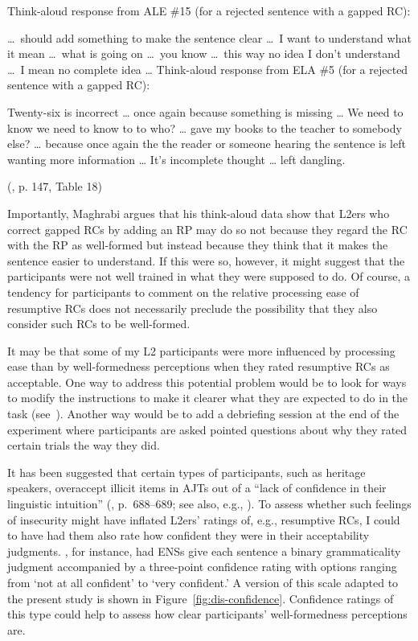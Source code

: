 \newpage

\pex\label{ex-dis-maghrabi}
\a Think-aloud response from ALE \#15 (for a rejected sentence with a gapped RC): \par\nobreak\vspace{5pt}
\dots~should add something to make the sentence clear \dots ~I want to understand what it mean \dots ~what is going on \dots ~you know \dots ~this way no idea I don't understand \dots ~I mean no complete idea \dots
\a Think-aloud response from ELA \#5 (for a rejected sentence with a gapped RC): \par\nobreak\vspace{5pt}
Twenty-six is incorrect \dots{} once again because something is missing \dots{} We need to know we need to know to to who? \dots{} gave my books to the teacher to somebody else? \dots{} because once again the the reader or someone hearing the sentence is left wanting more information \dots{} It's incomplete thought \dots{} left dangling. \par\nobreak\vspace{5pt}
\hfill (\cite{maghrabi1997}, p. 147, Table 18)
\xe 

\noindent Importantly, Maghrabi argues that his think-aloud data show that L2ers who correct gapped RCs by adding an RP may do so not because they regard the RC with the RP as well-formed but instead because they think that it makes the sentence easier to understand. If this were so, however, it might suggest that the participants were not well trained in what they were supposed to do. Of course, a tendency for participants to comment on the relative processing ease of resumptive RCs does not necessarily preclude the possibility that they also consider such RCs to be well-formed.

It may be that some of my L2 participants were more influenced by processing ease than by well-formedness perceptions when they rated resumptive RCs as acceptable. One way to address this potential problem would be to look for ways to modify the instructions to make it clearer what they are expected to do in the task (see~\cite{bley-vroman.etal1988}). Another way would be to add a debriefing session at the end of the experiment where participants are asked pointed questions about why they rated certain trials the way they did. 

It has been suggested that certain types of participants, such as heritage speakers, overaccept illicit items in AJTs out of a ``lack of confidence in their linguistic intuition'' (\cite{rinke.flores2014}, p.~688--689; see also, e.g., \cite{polinsky2016,sherkina-lieber.etal2011}). To assess whether such feelings of insecurity might have inflated L2ers' ratings of, e.g., resumptive RCs, I could to have had them also rate how confident they were in their acceptability judgments. \textcite{dillon.etal2019}, for instance, had ENSs give each sentence a binary grammaticality judgment accompanied by a three-point confidence rating with options ranging from `not at all confident' to `very confident.' A version of this scale adapted to the present study is shown in Figure~\ref{fig:dis-confidence}. Confidence ratings of this type could help to assess how clear participants' well-formedness perceptions are.


